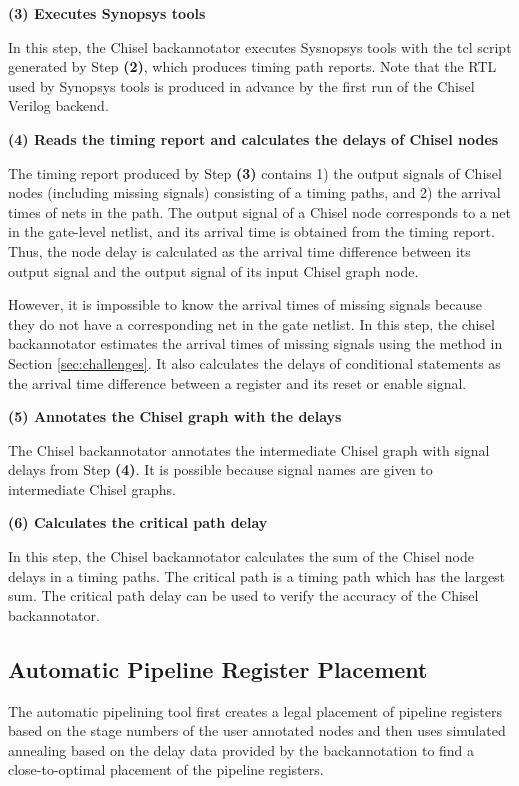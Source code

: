 {\bf (3) Executes Synopsys tools}

In this step, the Chisel backannotator executes Sysnopsys tools with the tcl script generated by Step {\bf (2)}, which produces timing path reports. Note that the RTL used by Synopsys tools is produced in advance by the first run of the Chisel Verilog backend.

{\bf (4) Reads the timing report and calculates the delays of Chisel nodes}

The timing report produced by Step {\bf (3)} contains 1) the output signals of Chisel nodes (including missing signals) consisting of a timing paths, and 2) the arrival times of nets in the path. The output signal of a Chisel node corresponds to a net in the gate-level netlist, and its arrival time is obtained from the timing report. Thus, the node delay is calculated as the arrival time difference between its output signal and the output signal of its input Chisel graph node.

However, it is impossible to know the arrival times of missing signals because they do not have a corresponding net in the gate netlist. In this step, the chisel backannotator estimates the arrival times of missing signals using the method in Section \ref{sec:challenges}. It also calculates the delays of conditional statements as the arrival time difference between a register and its reset or enable signal.

{\bf (5) Annotates the Chisel graph with the delays}

The Chisel backannotator annotates the intermediate Chisel graph with signal delays from Step {\bf (4)}. It is possible because signal names are given to intermediate Chisel graphs.

{\bf (6) Calculates the critical path delay}

In this step, the Chisel backannotator calculates the sum of the Chisel node delays in a timing paths. The critical path is a timing path which has the largest sum. The critical path delay can be used to verify the accuracy of the Chisel backannotator.

\subsection{Automatic Pipeline Register Placement}
The automatic pipelining tool first creates a legal placement of pipeline registers based on the stage numbers of the user annotated nodes and then uses simulated annealing based on the delay data provided by the backannotation to find a close-to-optimal placement of the pipeline registers. 

